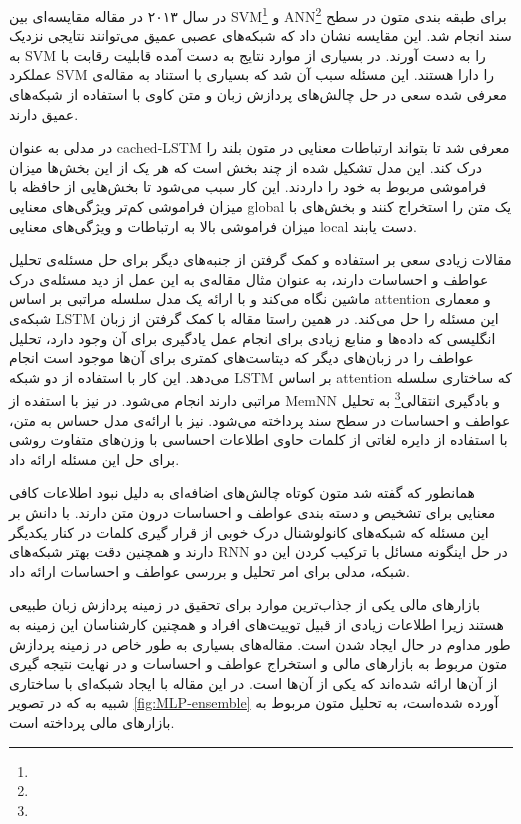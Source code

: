 \documentclass[12pt, a4paper, oneside]{report}
\begin{document}
در سال ۲۰۱۳ در مقاله
\cite{Moraes2013DocumentlevelSC}
مقایسه‌ای بین
SVM\footnote{}
و
ANN\footnote{}
برای طبقه بندی متون در سطح سند انجام شد. این مقایسه نشان داد که شبکه‌‌های عصبی عمیق می‌توانند نتایجی نزدیک به
SVM
را به دست آورند. در بسیاری از موارد نتایج به دست آمده قابلیت رقابت با عملکرد‌
SVM
را دارا هستند. این مسئله سبب آن شد که بسیاری با استناد به مقاله‌ی معرفی شده سعی در حل چالش‌های پردازش زبان و متن کاوی
با استفاده از شبکه‌های عمیق دارند.

در
\cite{xu2016cached}
مدلی به عنوان
cached-LSTM
معرفی شد تا بتواند ارتباطات معنایی در متون بلند را درک کند. این مدل تشکیل شده از چند بخش است که هر یک از این
بخش‌ها میزان فراموشی مربوط به خود را داردند. این کار سبب می‌شود تا بخش‌هایی از حافظه با میزان فراموشی کم‌تر ویژگی‌های
معنایی
global
یک متن را استخراج کنند و بخش‌های با میزان فراموشی بالا به ارتباطات و ویژگی‌های معنایی
local
دست یابند.

مقالات زیادی سعی بر استفاده و کمک گرفتن از جنبه‌های دیگر برای حل مسئله‌ی تحلیل عواطف و احساسات دارند،
به عنوان مثال مقاله‌ی
\cite{yin-etal-2017-document}
به این عمل از دید مسئله‌ی درک ماشین نگاه می‌کند و با ارائه یک مدل سلسله مراتبی بر اساس
attention
و معماری شبکه‌ی
LSTM
این مسئله را حل می‌کند.
در همین راستا مقاله
\cite{zhou-etal-2016-attention}
با کمک گرفتن از زبان انگلیسی که داده‌ها و منابع زیادی برای انجام عمل یادگیری برای آن وجود دارد، تحلیل
عواطف را در زبان‌های دیگر که دیتاست‌های کمتری برای آن‌ها موجود است انجام می‌دهد. این کار با استفاده از دو شبکه
LSTM
بر اساس
attention
که ساختاری سلسله مراتبی دارند انجام می‌شود.
در
\cite{ijcai2017-311}
نیز با استفده از
MemNN
و
بادگیری انتقالی\footnote{}
به تحلیل عواطف و احساسات در سطح سند پرداخته می‌شود.
\cite{teng-etal-2016-context}
نیز با ارائه‌ی مدل
حساس به متن، با استفاده از دایره لغاتی از کلمات حاوی اطلاعات احساسی با وزن‌های متفاوت روشی برای حل این مسئله ارائه داد.

همانطور که گفته شد متون کوتاه چالش‌های اضافه‌ای به دلیل نبود اطلاعات کافی معنایی برای تشخیص و دسته بندی عواطف
و احساسات درون متن دارند.
\cite{wang-etal-2016-combination}
با دانش بر این مسئله که شبکه‌های کانولوشنال درک خوبی از قرار گیری کلمات در کنار یکدیگر دارند و همچنین دقت
بهتر شبکه‌های
RNN
در حل اینگونه مسائل با ترکیب کردن این دو شبکه، مدلی برای امر تحلیل و بررسی عواطف و احساسات ارائه داد.

بازارهای مالی یکی از جذاب‌ترین موارد برای تحقیق در زمینه پردازش زبان طبیعی هستند زیرا اطلاعات زیادی از قبیل
توییت‌های افراد و همچنین کارشناسان این زمینه به طور مداوم در حال ایجاد شدن است. مقاله‌های بسیاری به طور خاص در زمینه
پردازش متون مربوط به بازارهای مالی و استخراج عواطف و احساسات و در نهایت نتیجه گیری از آن‌ها ارائه شده‌اند که
\cite{akhtar2017multilayer}
یکی از آن‌ها است. در این مقاله با ایجاد شبکه‌ای با ساختاری شبیه به
که در تصویر
\ref{fig:MLP-ensemble}
آورده شده‌است، به تحلیل متون مربوط به بازار‌های مالی پرداخته است.
\end{document}

